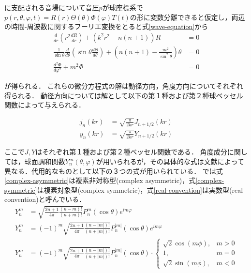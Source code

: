 \documentclass[a4paper]{jsarticle}
\begin{document}
に支配される音場について音圧$p$が球座標系で$p(r, \theta, \varphi, t) = R(r) \Theta(\theta) \Phi(\varphi) T(t) $の形に変数分離できると仮定し，両辺の時間-周波数に関するフーリエ変換をとると式\ref{wave-equation}から
\begin{align*}
    \frac{d}{d r}\left(r^{2} \frac{d R}{d r}\right)+\left(k^{2} r^{2}-n(n+1)\right) R                                                                    & =0 \\
    \frac{1}{\sin \theta} \frac{d}{d \theta}\left(\sin \theta \frac{d \Theta}{d \theta}\right)+\left(n(n+1)-\frac{m^{2}}{\sin ^{2} \theta}\right) \theta & =0 \\
    \frac{d^{2} \Phi}{d \varphi^{2}}+m^{2} \Phi                                                                                                          & =0
\end{align*}

が得られる．
これらの微分方程式の解は動径方向，角度方向についてそれぞれ得られる．
動径方向については解として以下の第１種および第２種球ベッセル関数によって与えられる．

\begin{align*}
    j_{n}(k r) & =\sqrt{\frac{\pi}{2 k r}} J_{n+1 / 2}(k r) \\
    y_{n}(k r) & =\sqrt{\frac{\pi}{2 k r}} Y_{n+1 / 2}(k r)
\end{align*}

ここで$J, Y$はそれぞれ第１種および第２種ベッセル関数である．
角度成分に関しては，球面調和関数$Y_{n}^{m}(\theta, \varphi)$が用いられるが，その具体的な式は文献によって異なる．代用的なものとして以下の３つの式が用いられている．
\cite{Andersson_undated-qg}では式\ref{complex-asymmetric}は複素非対称型(complex asymmetric)，式\ref{complex-symmetric}は複素対象型(complex symmetric)，式\ref{real-convention}は実数型(real convention)と呼んでいる．
\begin{align}
    Y_{n}^{m} & =\sqrt{\frac{2 n+1}{4 \pi} \frac{(n-m) !}{(n+m) !}} P_{n}^{m}(\cos \theta) e^{i m \varphi} \label{complex-asymmetric}                                          \\
    Y_{n}^{m} & =(-1)^{m} \sqrt{\frac{2 n+1}{4 \pi} \frac{(n-|m|) !}{(n+|m|) !}} P_{n}^{|m|}(\cos \theta) e^{i m \varphi}  \label{complex-symmetric}                           \\
    Y_{n}^{m} & =(-1)^{m} \sqrt{\frac{2 n+1}{4 \pi} \frac{(n-|m|) !}{(n+|m|) !}} P_{n}^{|m|}(\cos \theta) \cdot \left\{\begin{array}{ll}
        \sqrt{2} \cos (m \phi), & m>0 \\
        1,                      & m=0 \\
        \sqrt{2} \sin (m \phi), & m<0
    \end{array}\right.\label{real-convention} \\
\end{align}
\end{document}
